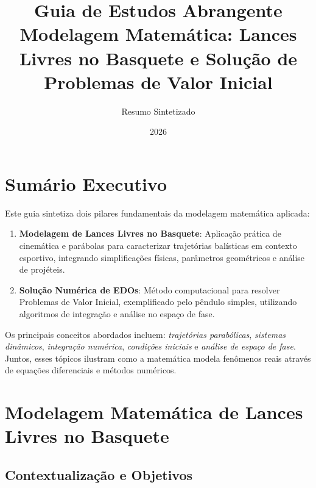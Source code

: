 \documentclass[12pt,a4paper]{article}
\title{\textbf{Guia de Estudos Abrangente} \\ \Large Modelagem Matemática: Lances Livres no Basquete e Solução de Problemas de Valor Inicial}
\author{Resumo Sintetizado}
\date{2026}
\begin{document}
\maketitle
\thispagestyle{empty}

\newpage


\section*{Sumário Executivo}

Este guia sintetiza dois pilares fundamentais da modelagem matemática aplicada:

\begin{enumerate}
    \item \textbf{Modelagem de Lances Livres no Basquete}: Aplicação prática de cinemática e parábolas para caracterizar trajetórias balísticas em contexto esportivo, integrando simplificações físicas, parâmetros geométricos e análise de projéteis.
    
    \item \textbf{Solução Numérica de EDOs}: Método computacional para resolver Problemas de Valor Inicial, exemplificado pelo pêndulo simples, utilizando algoritmos de integração e análise no espaço de fase.
\end{enumerate}

Os principais conceitos abordados incluem: \textit{trajetórias parabólicas}, \textit{sistemas dinâmicos}, \textit{integração numérica}, \textit{condições iniciais} e \textit{análise de espaço de fase}. Juntos, esses tópicos ilustram como a matemática modela fenômenos reais através de equações diferenciais e métodos numéricos.

\tableofcontents

\newpage


\section{Modelagem Matemática de Lances Livres no Basquete}

\subsection{Contextualização e Objetivos}
\end{document}
